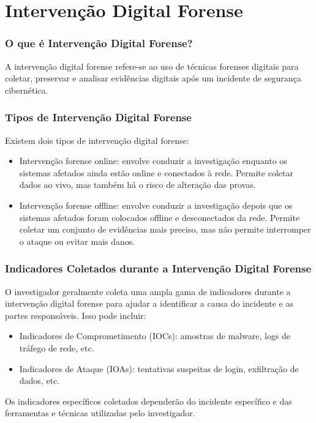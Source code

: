 \section{Intervenção Digital Forense}
\begin{frame}
  \frametitle{O que é Intervenção Digital Forense?}
  A intervenção digital forense refere-se ao uso de técnicas forenses digitais para coletar, preservar e analisar evidências digitais após um incidente de segurança cibernética.
\end{frame}

\begin{frame}
  \frametitle{Tipos de Intervenção Digital Forense}
  Existem dois tipos de intervenção digital forense:
  \begin{itemize}
    \item Intervenção forense online: envolve conduzir a investigação enquanto os sistemas afetados ainda estão online e conectados à rede. Permite coletar dados ao vivo, mas também há o risco de alteração das provas.
    \item Intervenção forense offline: envolve conduzir a investigação depois que os sistemas afetados foram colocados offline e desconectados da rede. Permite coletar um conjunto de evidências mais preciso, mas não permite interromper o ataque ou evitar mais danos.
  \end{itemize}
\end{frame}

\begin{frame}
  \frametitle{Indicadores Coletados durante a Intervenção Digital Forense}
  O investigador geralmente coleta uma ampla gama de indicadores durante a intervenção digital forense para ajudar a identificar a causa do incidente e as partes responsáveis. Isso pode incluir:
  \begin{itemize}
    \item Indicadores de Comprometimento (IOCs): amostras de malware, logs de tráfego de rede, etc.
    \item Indicadores de Ataque (IOAs): tentativas suspeitas de login, exfiltração de dados, etc.
  \end{itemize}
  Os indicadores específicos coletados dependerão do incidente específico e das ferramentas e técnicas utilizadas pelo investigador.
\end{frame}
